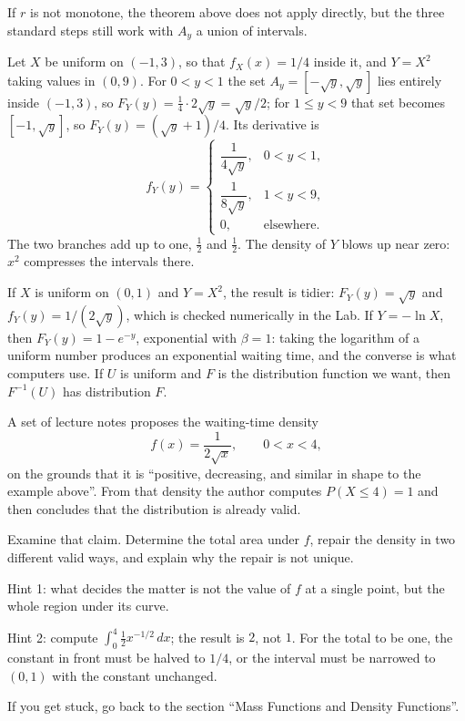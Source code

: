 If $r$ is not monotone, the theorem above does not apply directly, but the three standard
steps still work with $A_y$ a union of intervals.

\begin{contoh}
Let $X$ be uniform on $(-1,3)$, so that $f_X(x)=1/4$ inside it, and $Y=X^2$
taking values in $(0,9)$. For $0<y<1$ the set $A_y=[-\sqrt y,\sqrt y]$ lies entirely
inside $(-1,3)$, so $F_Y(y)=\tfrac14\cdot2\sqrt y=\sqrt y/2$; for $1\le y<9$
that set becomes $[-1,\sqrt y]$, so $F_Y(y)=(\sqrt y+1)/4$. Its derivative is
\[
f_Y(y)=\begin{cases}
\dfrac{1}{4\sqrt y}, & 0<y<1,\\[4pt]
\dfrac{1}{8\sqrt y}, & 1<y<9,\\[4pt]
0, & \text{elsewhere}.
\end{cases}
\]
The two branches add up to one, $\tfrac12$ and $\tfrac12$. The density of $Y$ blows up
near zero: $x^2$ compresses the intervals there.
\end{contoh}

If $X$ is uniform on $(0,1)$ and $Y=X^2$, the result is tidier: $F_Y(y)=\sqrt y$ and
$f_Y(y)=1/(2\sqrt y)$, which is checked numerically in the Lab. If $Y=-\ln X$, then
$F_Y(y)=1-e^{-y}$, exponential with $\beta=1$: taking the logarithm of a uniform number
produces an exponential waiting time, and the converse is what computers use.
If $U$ is uniform and $F$ is the distribution function we want, then $F^{-1}(U)$
has distribution $F$.

\begin{tantangan}
A set of lecture notes proposes the waiting-time density
\[
f(x)=\frac{1}{2\sqrt{x}},\qquad 0<x<4,
\]
on the grounds that it is ``positive, decreasing, and similar in shape to the example above''. From that density
the author computes $P(X\le4)=1$ and then concludes that the distribution is already valid.

Examine that claim. Determine the total area under $f$, repair the density in two different valid
ways, and explain why the repair is not unique.

Hint 1: what decides the matter is not the value of $f$ at a single point, but the whole region
under its curve.

Hint 2: compute $\int_0^4\tfrac12 x^{-1/2}\,dx$; the result is $2$, not $1$. For the
total to be one, the constant in front must be halved to $1/4$, or the interval must be
narrowed to $(0,1)$ with the constant unchanged.

If you get stuck, go back to the section ``Mass Functions and Density Functions''.
\end{tantangan}

